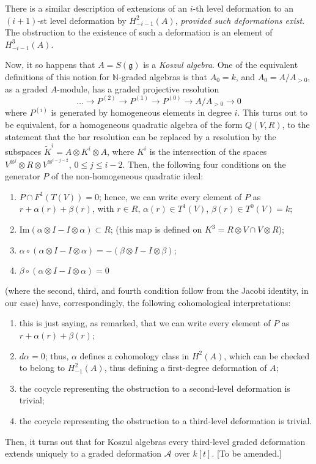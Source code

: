 \begin{remark}
There is a similar description of extensions of an $i$-th level deformation to an $(i+1)$-st level deformation by $H^2_{−i−1}(A)$, \emph{provided such deformations exist}. The obstruction to the existence of such a deformation is an element of $H^3_{−i−1}(A)$.

Now, it so happens that $A=S(\mathfrak g)$ is a \emph{Koszul algebra}. One of the equivalent definitions of this notion for $\mathbb N$-graded algebras is that $A_0=k$, and $A_0=A/A_{>0}$, as a graded $A$-module, has a graded projective resolution 
$$ \dots \to P^{(2)} \to P^{(1)} \to P^{(0)} \to A/A_{>0} \to 0$$
where $P^{(i)}$ is generated by homogeneous elements in degree $i$. This turns out to be equivalent, for a homogeneous quadratic algebra of the form $Q(V,R)$, to the statement that the bar resolution can be replaced by a resolution by the subspaces $\tilde K^i = A\otimes K^i \otimes A$, where $K^i$ is the intersection of the spaces $V^{\otimes^j} \otimes R \otimes V^{\otimes^{i-j-2}}$, $0\le j\le i-2$. Then, the following four conditions on the generator $P$ of the non-homogeneous quadratic ideal:
\begin{enumerate}
 \item $P\cap F^1(T(V))= 0$; hence, we can write every element of $P$ as $r+\alpha(r)+\beta(r)$, with $r\in R$, $\alpha(r)\in T^1(V)$, $\beta(r)\in T^0(V)=k$;
 \item $\text{Im}(\alpha\otimes I - I\otimes \alpha) \subset R$; (this map is defined on $K^3=R\otimes V \cap V\otimes R$);
 \item $\alpha\circ(\alpha\otimes I-I\otimes \alpha) = -(\beta\otimes I-I\otimes \beta)$;
 \item $\beta\circ (\alpha\otimes I-I\otimes \alpha) = 0$
\end{enumerate}
(where the second, third, and fourth condition follow from the Jacobi identity, in our case) have, correspondingly, the following cohomological interpretations:
\begin{enumerate}
 \item this is just saying, as remarked, that we can write every element of $P$ as $r+\alpha(r)+\beta(r)$;
 \item $d\alpha =0$; thus, $\alpha$ defines a cohomology class in $H^2(A)$, which can be checked to belong to $H^2_{-1}(A)$, thus defining a first-degree deformation of $A$;
 \item the cocycle representing the obstruction to a second-level deformation is trivial;
 \item the cocycle representing the obstruction to a third-level deformation is trivial.
\end{enumerate}
Then, it turns out that for Koszul algebras every third-level graded deformation extends uniquely to a graded deformation $\mathcal A$ over $k[t]$.  [To be amended.]
\end{remark}





